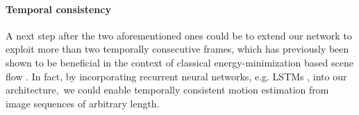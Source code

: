 \paragraph{Temporal consistency}
A next step after the two aforementioned ones could be to extend our network to exploit more than two
temporally consecutive frames, which has previously been shown to be beneficial in the
context of classical energy-minimization based scene flow \cite{TemporalSF}.
In fact, by incorporating recurrent neural networks, e.g. LSTMs \cite{LSTM},
into our architecture, we could enable temporally consistent motion estimation
from image sequences of arbitrary length.

%
%
